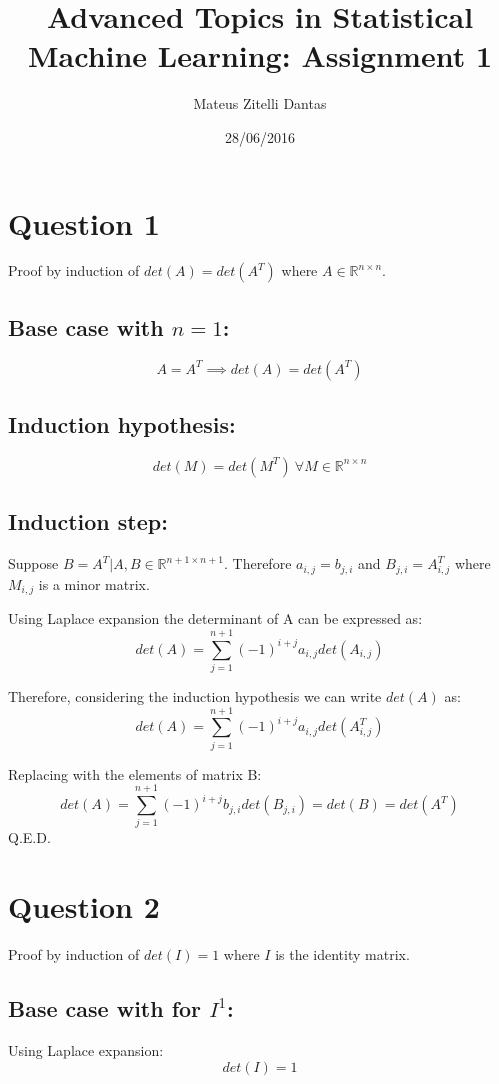 \documentclass[a4paper]{article}
\title{Advanced Topics in Statistical Machine Learning: Assignment 1}
\author{Mateus Zitelli Dantas}
\date{28/06/2016}
\begin{document}
\maketitle

\section{Question 1}
Proof by induction of $det(A) = det(A^T)$ where $A \in \mathbb{R}^{n \times n}$.

\subsection{Base case with $n = 1$:}

$$
A = A^T \implies det(A) = det(A^T)
$$

\subsection{Induction hypothesis:}

$$det(M) = det(M^T) \ \forall M \in \mathbb{R}^{n \times n}$$

\subsection{Induction step:}

Suppose $B = A^T | A, B \in \mathbb{R}^{n+1 \times n+1}$. Therefore $a_{i,j} = b_{j,i}$ and $B_{j,i} = A_{i,j}^T$ where $M_{i,j}$ is a minor matrix.

Using Laplace expansion the determinant of A can be expressed as:
$$
det(A) = \sum^{n + 1}_{j = 1} (-1)^{i + j} a_{i,j} det(A_{i,j})
$$

Therefore, considering the induction hypothesis we can write $det(A)$ as:
$$
det(A) = \sum^{n + 1}_{j = 1} (-1)^{i + j} a_{i,j} det(A_{i,j}^T)
$$

Replacing with the elements of matrix B:
$$
det(A) = \sum^{n + 1}_{j = 1} (-1)^{i + j} b_{j,i} det(B_{j,i}) = det(B) = det(A^T) 
$$
Q.E.D.

\section{Question 2}
Proof by induction of $det(I) = 1$ where $I$ is the identity matrix.

\subsection{Base case with for $I^1$:}
Using Laplace expansion:
$$
det(I) = 1 
$$
\end{document}
